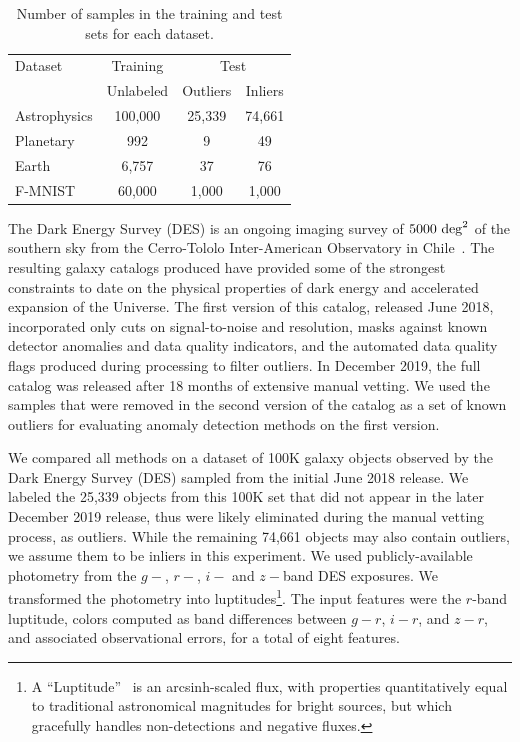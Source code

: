 \documentclass[utf8]{frontiersFPHY} %
\begin{document}
\begin{table}
\caption{Number of samples in the training and test sets for each dataset.}
\label{tab:datasets}
\centering
\begin{tabular}{l|c|cc}
  \toprule
  Dataset & Training & \multicolumn{2}{c}{Test}\\
   & Unlabeled &  Outliers &  Inliers \\
  \midrule
  Astrophysics & 100,000   &  25,339 &  74,661 \\
  Planetary & 992 &  9 & 49 \\
  Earth & 6,757 & 37 & 76  \\
  F-MNIST & 60,000 & 1,000 & 1,000  \\
  \bottomrule
\end{tabular}
\end{table}

The Dark Energy Survey (DES) is an ongoing imaging survey of
$5000~{\rm deg}^2$ of the southern sky from the Cerro-Tololo
Inter-American Observatory in Chile~\cite{zuntz2018dark}. The resulting galaxy 
catalogs produced have provided some of the strongest constraints to date on
the physical properties of dark energy and accelerated expansion
of the Universe. The first version of this catalog, released June 2018, incorporated
only cuts on signal-to-noise and resolution, masks against known detector
anomalies and data quality indicators, and the automated data quality
flags produced during processing to filter outliers. 
In December 2019, the full catalog
was released after 18 months of extensive manual vetting. We used the samples 
that were removed in the second version of the catalog as a set of known
outliers for evaluating anomaly detection methods on the first version.

We compared all methods on a dataset of 100K galaxy objects
observed by the Dark Energy Survey (DES) sampled from the initial June 2018 release.
We labeled the 25,339 objects from this 100K set that did not appear in the 
later December 2019 release, thus were likely eliminated during the manual 
vetting process, as outliers.
While the remaining 74,661 objects may also contain outliers, we assume them 
to be inliers in this experiment. We used publicly-available photometry from 
the $g-$, $r-$, $i-$ and $z-$band DES exposures.  We
transformed the photometry into luptitudes\footnote{A
``Luptitude''~\cite{lupton99} is an arcsinh-scaled flux, with
properties quantitatively equal to
traditional astronomical magnitudes for bright sources, but which
gracefully handles non-detections and negative fluxes.}.  The input features 
were the $r$-band luptitude, colors computed as band differences between
$g-r$, $i-r$, and $z-r$, and associated observational errors, for a total of 
eight features.
%
\end{document}
